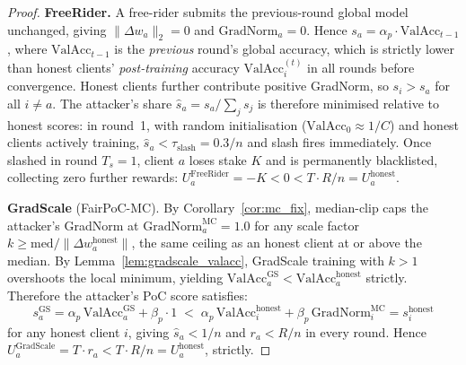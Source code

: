 \documentclass[journal]{IEEEtran}
\theoremstyle{definition}
\theoremstyle{remark}
\begin{document}
\begin{proof}
\textbf{FreeRider.}
A free-rider submits the previous-round global model unchanged,
giving $\|\Delta w_a\|_2 = 0$ and $\mathrm{GradNorm}_a = 0$.
Hence $s_a = \alpha_p \cdot \mathrm{ValAcc}_{t-1}$, where
$\mathrm{ValAcc}_{t-1}$ is the \emph{previous} round's global
accuracy, which is strictly lower than honest clients'
\emph{post-training} accuracy $\mathrm{ValAcc}_i^{(t)}$ in all
rounds before convergence.
Honest clients further contribute positive GradNorm, so
$s_i > s_a$ for all $i \neq a$.
The attacker's share $\hat{s}_a = s_a / \sum_j s_j$ is therefore
minimised relative to honest scores: in round~1, with random
initialisation ($\mathrm{ValAcc}_{0} \approx 1/C$) and honest
clients actively training, $\hat{s}_a < \tau_{\mathrm{slash}} = 0.3/n$
and slash fires immediately.
Once slashed in round $T_s = 1$, client $a$ loses stake $K$ and is
permanently blacklisted, collecting zero further rewards:
$U_a^{\mathrm{FreeRider}} = -K < 0 < T \cdot R/n = U_a^{\mathrm{honest}}$.

\textbf{GradScale} (FairPoC-MC).
By Corollary~\ref{cor:mc_fix}, median-clip caps the attacker's
GradNorm at $\mathrm{GradNorm}_a^{\mathrm{MC}} = 1.0$ for any
scale factor $k \geq \mathrm{med}/\|\Delta w_a^{\mathrm{honest}}\|$,
the same ceiling as an honest client at or above the median.
By Lemma~\ref{lem:gradscale_valacc}, GradScale training with $k > 1$
overshoots the local minimum, yielding
$\mathrm{ValAcc}_a^{\mathrm{GS}} < \mathrm{ValAcc}_a^{\mathrm{honest}}$
strictly.
Therefore the attacker's PoC score satisfies:
\begin{equation}
  s_a^{\mathrm{GS}} = \alpha_p\,\mathrm{ValAcc}_a^{\mathrm{GS}}
                    + \beta_p \cdot 1
  \;<\; \alpha_p\,\mathrm{ValAcc}_i^{\mathrm{honest}}
      + \beta_p\,\mathrm{GradNorm}_i^{\mathrm{MC}}
  = s_i^{\mathrm{honest}}
  \label{eq:gradscale_score}
\end{equation}
for any honest client $i$, giving $\hat{s}_a < 1/n$ and
$r_a < R/n$ in every round.
Hence $U_a^{\mathrm{GradScale}} = T \cdot r_a < T \cdot R/n = U_a^{\mathrm{honest}}$,
strictly.


\end{proof}
\end{document}
